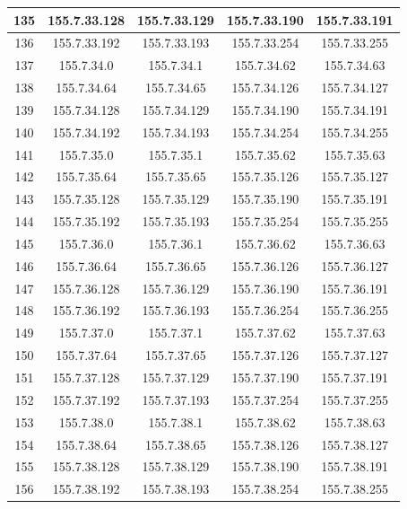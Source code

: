 \documentclass[letterpaper,12pt]{article}
\begin{document}
\begin{longtable}{|c|c|c|c|c|}
        135 & 155.7.33.128 & 155.7.33.129 & 155.7.33.190 & 155.7.33.191 \\ \hline
        136 & 155.7.33.192 & 155.7.33.193 & 155.7.33.254 & 155.7.33.255 \\ \hline
        137 & 155.7.34.0 & 155.7.34.1 & 155.7.34.62 & 155.7.34.63 \\ \hline
        138 & 155.7.34.64 & 155.7.34.65 & 155.7.34.126 & 155.7.34.127 \\ \hline
        139 & 155.7.34.128 & 155.7.34.129 & 155.7.34.190 & 155.7.34.191 \\ \hline
        140 & 155.7.34.192 & 155.7.34.193 & 155.7.34.254 & 155.7.34.255 \\ \hline
        141 & 155.7.35.0 & 155.7.35.1 & 155.7.35.62 & 155.7.35.63 \\ \hline
        142 & 155.7.35.64 & 155.7.35.65 & 155.7.35.126 & 155.7.35.127 \\ \hline
        143 & 155.7.35.128 & 155.7.35.129 & 155.7.35.190 & 155.7.35.191 \\ \hline
        144 & 155.7.35.192 & 155.7.35.193 & 155.7.35.254 & 155.7.35.255 \\ \hline
        145 & 155.7.36.0 & 155.7.36.1 & 155.7.36.62 & 155.7.36.63 \\ \hline
        146 & 155.7.36.64 & 155.7.36.65 & 155.7.36.126 & 155.7.36.127 \\ \hline
        147 & 155.7.36.128 & 155.7.36.129 & 155.7.36.190 & 155.7.36.191 \\ \hline
        148 & 155.7.36.192 & 155.7.36.193 & 155.7.36.254 & 155.7.36.255 \\ \hline
        149 & 155.7.37.0 & 155.7.37.1 & 155.7.37.62 & 155.7.37.63 \\ \hline
        150 & 155.7.37.64 & 155.7.37.65 & 155.7.37.126 & 155.7.37.127 \\ \hline
        151 & 155.7.37.128 & 155.7.37.129 & 155.7.37.190 & 155.7.37.191 \\ \hline
        152 & 155.7.37.192 & 155.7.37.193 & 155.7.37.254 & 155.7.37.255 \\ \hline
        153 & 155.7.38.0 & 155.7.38.1 & 155.7.38.62 & 155.7.38.63 \\ \hline
        154 & 155.7.38.64 & 155.7.38.65 & 155.7.38.126 & 155.7.38.127 \\ \hline
        155 & 155.7.38.128 & 155.7.38.129 & 155.7.38.190 & 155.7.38.191 \\ \hline
        156 & 155.7.38.192 & 155.7.38.193 & 155.7.38.254 & 155.7.38.255 \\ \hline

\end{longtable}
\end{document}

